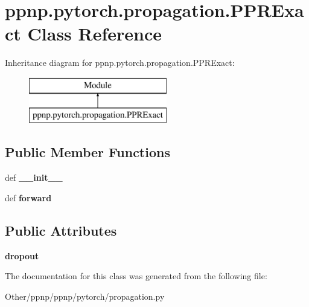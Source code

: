\hypertarget{classppnp_1_1pytorch_1_1propagation_1_1PPRExact}{}\section{ppnp.\+pytorch.\+propagation.\+P\+P\+R\+Exact Class Reference}
\label{classppnp_1_1pytorch_1_1propagation_1_1PPRExact}
Inheritance diagram for ppnp.\+pytorch.\+propagation.\+P\+P\+R\+Exact\+:\begin{figure}[H]
\begin{center}
\leavevmode
\includegraphics[height=2.000000cm]{classppnp_1_1pytorch_1_1propagation_1_1PPRExact}
\end{center}
\end{figure}
\subsection*{Public Member Functions}
\begin{DoxyCompactItemize}
\item 
\mbox{\label{classppnp_1_1pytorch_1_1propagation_1_1PPRExact_a7e82a963f90a055f224c376f367a4dee}} 
def {\bfseries \+\_\+\+\_\+init\+\_\+\+\_\+}
\item 
\mbox{\label{classppnp_1_1pytorch_1_1propagation_1_1PPRExact_a55aa7ed46eb10d6dd699572a8c68a48c}} 
def {\bfseries forward}
\end{DoxyCompactItemize}
\subsection*{Public Attributes}
\begin{DoxyCompactItemize}
\item 
\mbox{\label{classppnp_1_1pytorch_1_1propagation_1_1PPRExact_a0bbc3624728fa3441ba5a11f3ed5f426}} 
{\bfseries dropout}
\end{DoxyCompactItemize}


The documentation for this class was generated from the following file\+:\begin{DoxyCompactItemize}
\item 
Other/ppnp/ppnp/pytorch/propagation.\+py\end{DoxyCompactItemize}
